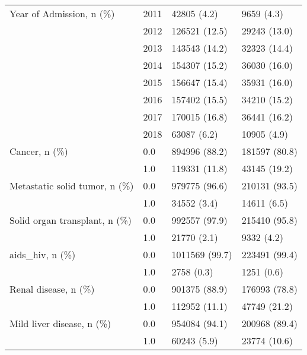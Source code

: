 \begin{tabular}{llll}
Year of Admission, n (\%) & 2011 &                    42805 (4.2) &        9659 (4.3) \\
                                       & 2012 &                  126521 (12.5) &      29243 (13.0) \\
                                       & 2013 &                  143543 (14.2) &      32323 (14.4) \\
                                       & 2014 &                  154307 (15.2) &      36030 (16.0) \\
                                       & 2015 &                  156647 (15.4) &      35931 (16.0) \\
                                       & 2016 &                  157402 (15.5) &      34210 (15.2) \\
                                       & 2017 &                  170015 (16.8) &      36441 (16.2) \\
                                       & 2018 &                    63087 (6.2) &       10905 (4.9) \\
Cancer, n (\%) & 0.0 &                  894996 (88.2) &     181597 (80.8) \\
                                       & 1.0 &                  119331 (11.8) &      43145 (19.2) \\
Metastatic solid tumor, n (\%) & 0.0 &                  979775 (96.6) &     210131 (93.5) \\
                                       & 1.0 &                    34552 (3.4) &       14611 (6.5) \\
Solid organ transplant, n (\%) & 0.0 &                  992557 (97.9) &     215410 (95.8) \\
                                       & 1.0 &                    21770 (2.1) &        9332 (4.2) \\
aids\_hiv, n (\%) & 0.0 &                 1011569 (99.7) &     223491 (99.4) \\
                                       & 1.0 &                     2758 (0.3) &        1251 (0.6) \\
Renal disease, n (\%) & 0.0 &                  901375 (88.9) &     176993 (78.8) \\
                                       & 1.0 &                  112952 (11.1) &      47749 (21.2) \\
Mild liver disease, n (\%) & 0.0 &                  954084 (94.1) &     200968 (89.4) \\
                                       & 1.0 &                    60243 (5.9) &      23774 (10.6) \\

\end{tabular}
